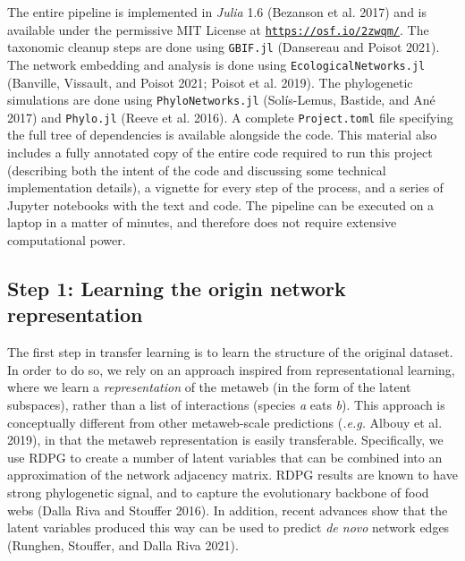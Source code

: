 \documentclass[10pt,oneside]{article}
\begin{document}
The entire pipeline is implemented in \emph{Julia} 1.6 (Bezanson et al.
2017) and is available under the permissive MIT License at
\href{https://osf.io/2zwqm/}{\texttt{https://osf.io/2zwqm/}}. The
taxonomic cleanup steps are done using \texttt{GBIF.jl} (Dansereau and
Poisot 2021). The network embedding and analysis is done using
\texttt{EcologicalNetworks.jl} (Banville, Vissault, and Poisot 2021;
Poisot et al. 2019). The phylogenetic simulations are done using
\texttt{PhyloNetworks.jl} (Solís-Lemus, Bastide, and Ané 2017) and
\texttt{Phylo.jl} (Reeve et al. 2016). A complete \texttt{Project.toml}
file specifying the full tree of dependencies is available alongside the
code. This material also includes a fully annotated copy of the entire
code required to run this project (describing both the intent of the
code and discussing some technical implementation details), a vignette
for every step of the process, and a series of Jupyter notebooks with
the text and code. The pipeline can be executed on a laptop in a matter
of minutes, and therefore does not require extensive computational
power.

\hypertarget{step-1-learning-the-origin-network-representation}{%
\subsection{Step 1: Learning the origin network
representation}\label{step-1-learning-the-origin-network-representation}}

The first step in transfer learning is to learn the structure of the
original dataset. In order to do so, we rely on an approach inspired
from representational learning, where we learn a \emph{representation}
of the metaweb (in the form of the latent subspaces), rather than a list
of interactions (species \emph{a} eats \emph{b}). This approach is
conceptually different from other metaweb-scale predictions
(\emph{.e.g.} Albouy et al. 2019), in that the metaweb representation is
easily transferable. Specifically, we use RDPG to create a number of
latent variables that can be combined into an approximation of the
network adjacency matrix. RDPG results are known to have strong
phylogenetic signal, and to capture the evolutionary backbone of food
webs (Dalla Riva and Stouffer 2016). In addition, recent advances show
that the latent variables produced this way can be used to predict
\emph{de novo} network edges (Runghen, Stouffer, and Dalla Riva 2021).
\end{document}
